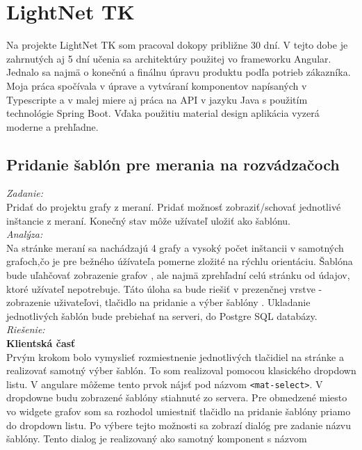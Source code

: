 \documentclass[11pt, oneside]{report}
\begin{document}
\section{LightNet TK}
Na projekte LightNet TK som pracoval dokopy približne  30 dní. V tejto dobe  je zahrnutých aj 5 dní učenia  sa architektúry použitej vo frameworku Angular. Jednalo sa najmä o konečnú a finálnu úpravu produktu podľa potrieb zákazníka. Moja práca spočívala v úprave a vytváraní  komponentov napísaných v Typescripte a v malej miere aj práca na API  v jazyku Java s použitím technológie Spring Boot. Vďaka použitiu material design aplikácia vyzerá moderne a prehľadne.
\subsection{Pridanie šablón pre merania na rozvádzačoch }
\textit{Zadanie:}\\
Pridať do projektu grafy  z meraní. Pridať možnosť zobraziť/schovať jednotlivé inštancie  z meraní. Konečný stav môže užívateľ uložiť ako šablónu.
\\\textit{Analýza:}\\
Na stránke meraní sa nachádzajú 4 grafy  a vysoký počet inštancii v samotných grafoch,čo  je pre bežného úžívateľa pomerne zložité na rýchlu orientáciu. 
Šablóna bude uľahčovať zobrazenie grafov , ale najmä zprehľadní celú stránku od  údajov, ktoré užívateľ nepotrebuje. Táto úloha sa bude riešiť v prezenčnej vrstve - zobrazenie uživateľovi, tlačidlo na pridanie a výber šablóny . Ukladanie jednotlivých šablón bude prebiehať  na serveri, do Postgre SQL databázy.
\\\textit{Riešenie:}\\
\textbf{Klientská časť}\\
Prvým krokom bolo vymyslieť rozmiestnenie jednotlivých  tlačidiel na stránke a realizovať samotný výber šablón. To som realizoval pomocou klasického dropdown listu. V angulare môžeme tento  prvok nájsť pod názvom \lstset{language=HTML5}
\lstinline!<mat-select>!. V dropdowne budu zobrazené šablóny stiahnuté zo servera. Pre obmedzené miesto vo widgete grafov som sa rozhodol umiestniť tlačidlo na pridanie šablóny priamo do dropdown listu. Po výbere tejto možnosti sa zobrazí dialóg pre zadanie názvu šablóny. Tento dialog je realizovaný ako samotný komponent s názvom \lstset{language=HTML5}
\end{document}
